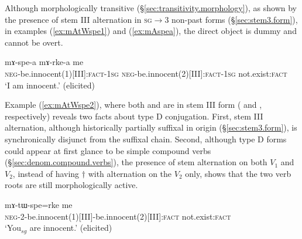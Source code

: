  Although morphologically transitive (§\ref{sec:transitivity.morphology}), as shown by  the presence of stem III alternation in \textsc{sg}$\rightarrow$3 non-past forms (§\ref{sec:stem3.form}), in examples (\ref{ex:mAtWspe1}) and (\ref{ex:mAspea}), the direct object is dummy and cannot be overt.  
  
\begin{exe}
\ex \label{ex:mAspea}
\gll mɤ-spe-a mɤ-rke-a me  \\
\textsc{neg}-be.innocent(1)[III]:\textsc{fact}-\textsc{1sg} \textsc{neg}-be.innocent(2)[III]:\textsc{fact}-\textsc{1sg} not.exist:\textsc{fact} \\
\glt `I am innocent.' (elicited)
\end{exe} 
 
Example (\ref{ex:mAtWspe2}), where both  and  are in stem III form ( and , respectively) reveals two facts about type D conjugation. First, stem III alternation, although historically partially suffixal in origin (§\ref{sec:stem3.form}), is synchronically disjunct from the suffixal chain. Second, although type D forms could appear at first glance to be simple compound verbs (§\ref{sec:denom.compound.verbs}), the presence of stem alternation on both $V_1$ and $V_2$, instead of having $\dagger$ with alternation on the $V_2$ only, shows that the two verb roots are still morphologically active.

\begin{exe}
\ex \label{ex:mAtWspe2}
\gll  mɤ-tɯ-spe=rke me  \\
\textsc{neg}-2-be.innocent(1)[III]-be.innocent(2)[III]:\textsc{fact} not.exist:\textsc{fact} \\
\glt `You$_{sg}$ are innocent.' (elicited)
\end{exe} 
